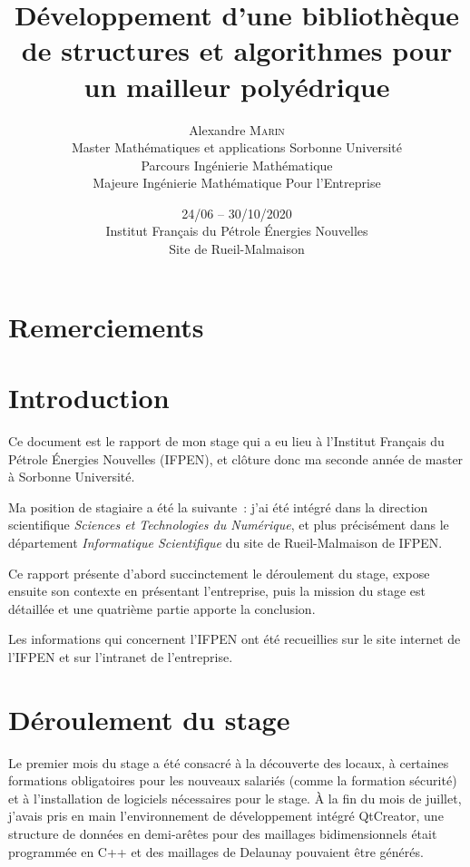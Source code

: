 \documentclass[12pt,a4paper]{report}
\begin{document}
\begin{titlepage}
\author{Alexandre \textsc{Marin}\\ Master Mathématiques et applications Sorbonne Université\\ Parcours Ingénierie Mathématique\\ Majeure Ingénierie Mathématique Pour l'Entreprise}
\date{24/06 -- 30/10/2020\\ Institut Fran\c{c}ais du P\'etrole \'Energies Nouvelles\\ Site de Rueil-Malmaison}
\title{Développement d’une bibliothèque de structures et algorithmes pour un mailleur polyédrique}
\maketitle
\end{titlepage}


\section*{Remerciements}


\tableofcontents
\newpage


\section{Introduction}
Ce document est le rapport de mon stage qui a eu lieu à l'Institut Français du Pétrole \'Energies Nouvelles (IFPEN), et clôture donc ma seconde année de master à Sorbonne Université.

Ma position de stagiaire a été la suivante~: j'ai été intégré dans la direction scientifique \emph{Sciences et Technologies du Numérique}, et plus précisément dans le département \emph{Informatique Scientifique} du site de Rueil-Malmaison de IFPEN.

Ce rapport présente d'abord succinctement le déroulement du stage, expose ensuite son contexte en présentant l'entreprise, puis la mission du stage est détaillée et une quatrième partie apporte la conclusion.

Les informations qui concernent l'IFPEN ont été recueillies sur le site internet de l'IFPEN et sur l'intranet de l'entreprise.

\newpage
\section{Déroulement du stage}
Le premier mois du stage a été consacré à la découverte des locaux, à certaines formations obligatoires pour les nouveaux salariés (comme la formation sécurité) et à l'installation de logiciels nécessaires pour le stage. \`A la fin du mois de juillet, j'avais pris en main l'environnement de développement intégré QtCreator, une structure de données en demi-arêtes pour des maillages bidimensionnels était programmée en C++ et des maillages de Delaunay pouvaient être générés.
\end{document}
